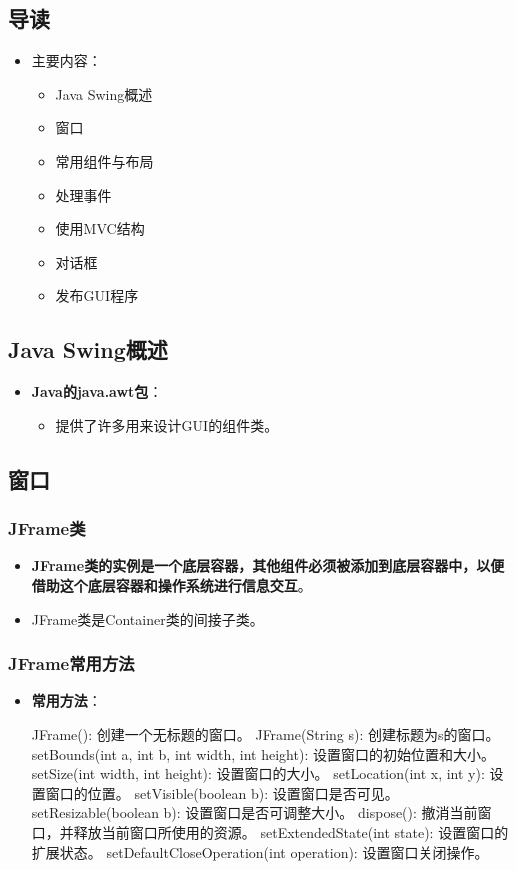 \documentclass[a4paper, 10pt]{ctexart}
\begin{document}
\subsection{导读}
\begin{itemize}
  \item 主要内容：
  \begin{itemize}
    \item Java Swing概述
    \item 窗口
    \item 常用组件与布局
    \item 处理事件
    \item 使用MVC结构
    \item 对话框
    \item 发布GUI程序
  \end{itemize}
\end{itemize}

\subsection{Java Swing概述}
\begin{itemize}
  \item \textbf{Java的java.awt包}：
  \begin{itemize}
    \item 提供了许多用来设计GUI的组件类。
  \end{itemize}
\end{itemize}

\subsection{窗口}
\subsubsection{JFrame类}
\begin{itemize}
  \item \textbf{JFrame类的实例是一个底层容器，其他组件必须被添加到底层容器中，以便借助这个底层容器和操作系统进行信息交互}。
  \item JFrame类是Container类的间接子类。
\end{itemize}

\subsubsection{JFrame常用方法}
\begin{itemize}
  \item \textbf{常用方法}：
  \begin{codeblock}
JFrame(): 创建一个无标题的窗口。
JFrame(String s): 创建标题为s的窗口。
setBounds(int a, int b, int width, int height): 设置窗口的初始位置和大小。
setSize(int width, int height): 设置窗口的大小。
setLocation(int x, int y): 设置窗口的位置。
setVisible(boolean b): 设置窗口是否可见。
setResizable(boolean b): 设置窗口是否可调整大小。
dispose(): 撤消当前窗口，并释放当前窗口所使用的资源。
setExtendedState(int state): 设置窗口的扩展状态。
setDefaultCloseOperation(int operation): 设置窗口关闭操作。
  \end{codeblock}
\end{itemize}
\end{document}
